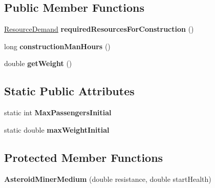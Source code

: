 \subsection*{Public Member Functions}
\begin{DoxyCompactItemize}
\item 
\hyperlink{classuniverse_1_1_resource_demand}{Resource\+Demand} {\bfseries required\+Resources\+For\+Construction} ()\hypertarget{classtools_1_1vehicles_1_1space_1_1_asteroid_miner_medium_acfe81650a19ae3ecbf3a2a24a15c14db}{}\label{classtools_1_1vehicles_1_1space_1_1_asteroid_miner_medium_acfe81650a19ae3ecbf3a2a24a15c14db}

\item 
long {\bfseries construction\+Man\+Hours} ()\hypertarget{classtools_1_1vehicles_1_1space_1_1_asteroid_miner_medium_a4abbe5ee1df4469ac80305209661b2e3}{}\label{classtools_1_1vehicles_1_1space_1_1_asteroid_miner_medium_a4abbe5ee1df4469ac80305209661b2e3}

\item 
double {\bfseries get\+Weight} ()\hypertarget{classtools_1_1vehicles_1_1space_1_1_asteroid_miner_medium_af1f37384ef2cd7c10e8ade704e104f64}{}\label{classtools_1_1vehicles_1_1space_1_1_asteroid_miner_medium_af1f37384ef2cd7c10e8ade704e104f64}

\end{DoxyCompactItemize}
\subsection*{Static Public Attributes}
\begin{DoxyCompactItemize}
\item 
static int {\bfseries Max\+Passengers\+Initial}\hypertarget{classtools_1_1vehicles_1_1space_1_1_asteroid_miner_medium_a30b4ab4dbaf32aa8181f20a1837f235a}{}\label{classtools_1_1vehicles_1_1space_1_1_asteroid_miner_medium_a30b4ab4dbaf32aa8181f20a1837f235a}

\item 
static double {\bfseries max\+Weight\+Initial}\hypertarget{classtools_1_1vehicles_1_1space_1_1_asteroid_miner_medium_aaa479959dba0cc5ec70eb84e3fda8b0b}{}\label{classtools_1_1vehicles_1_1space_1_1_asteroid_miner_medium_aaa479959dba0cc5ec70eb84e3fda8b0b}

\end{DoxyCompactItemize}
\subsection*{Protected Member Functions}
\begin{DoxyCompactItemize}
\item 
{\bfseries Asteroid\+Miner\+Medium} (double resistance, double start\+Health)\hypertarget{classtools_1_1vehicles_1_1space_1_1_asteroid_miner_medium_a85da50786a759a107c2391f63e8fd2c1}{}\label{classtools_1_1vehicles_1_1space_1_1_asteroid_miner_medium_a85da50786a759a107c2391f63e8fd2c1}

\end{DoxyCompactItemize}
